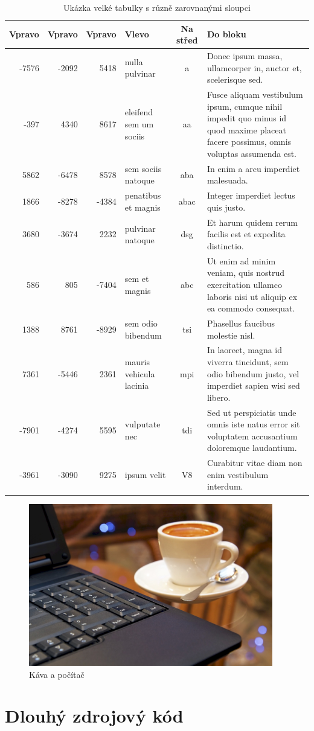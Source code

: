 \documentclass[czech,bachelor,dept460,male,cpp,cpdeclaration]{diploma}
\begin{document}
\begin{table}
	\centering
	\caption{Ukázka velké tabulky s různě zarovnanými sloupci}
	\label{tab:Sidewaystable}
\begin{tabular}{rrrlcp{95mm}}
\toprule
Vpravo	&	Vpravo	&	Vpravo	&	Vlevo					&	Na střed	&	Do bloku	\\
\midrule
-7576	&	-2092	&	5418	&	nulla pulvinar			&	a		&	Donec ipsum massa, ullamcorper in, auctor et, scelerisque sed.	\\
-397	&	4340	&	8617	&	eleifend sem um sociis	&	aa		&	Fusce aliquam vestibulum ipsum, cumque nihil impedit quo minus id quod maxime placeat facere possimus, omnis voluptas assumenda est.	\\
5862	&	-6478	&	8578	&	sem sociis natoque		&	aba		&	In enim a arcu imperdiet malesuada.	\\
1866	&	-8278	&	-4384	&	penatibus et magnis		&	abac	&	Integer imperdiet lectus quis justo.	\\
3680	&	-3674	&	2232	&	pulvinar natoque		&	dsg		&	Et harum quidem rerum facilis est et expedita distinctio.	\\
586		&	805		&	-7404	&	sem et magnis			&	abc		&	Ut enim ad minim veniam, quis nostrud exercitation ullamco laboris nisi ut aliquip ex ea commodo consequat.	\\
1388	&	8761	&	-8929	&	sem odio bibendum		&	tsi		&	Phasellus faucibus molestie nisl.	\\
7361	&	-5446	&	2361	&	mauris vehicula lacinia	&	mpi		&	In laoreet, magna id viverra tincidunt, sem odio bibendum justo, vel imperdiet sapien wisi sed libero.	\\
-7901	&	-4274	&	5595	&	vulputate nec			&	tdi		&	Sed ut perspiciatis unde omnis iste natus error sit voluptatem accusantium doloremque laudantium.	\\
-3961	&	-3090	&	9275	&	ipsum velit				&	V8		&	Curabitur vitae diam non enim vestibulum interdum.	\\
\bottomrule
\end{tabular}
\end{table}


\begin{figure}
	\centering
	\includegraphics[width=0.95\textwidth]{Figures/CoffeeAndComputer.jpg}
	\caption{Káva a počítač \cite{AhDTEmY2CY7Qv65e}}
	\label{fig:CoffeAndComputerInAppendix}
\end{figure}


\section{Dlouhý zdrojový kód}

\end{document}
